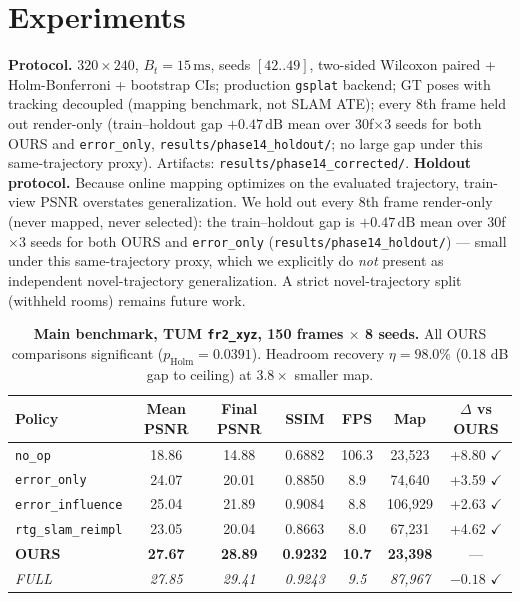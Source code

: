 \documentclass[10pt,twocolumn,letterpaper]{article}
\begin{document}
\section{Experiments}
\label{sec:experiments}
\textbf{Protocol.} $320 \times 240$, $B_t = 15\,\mathrm{ms}$, seeds $[42..49]$, two-sided Wilcoxon paired + Holm-Bonferroni + bootstrap CIs; production \texttt{gsplat} backend; GT poses with tracking decoupled (mapping benchmark, not SLAM ATE); every 8th frame held out render-only (train--holdout gap $+0.47\,\mathrm{dB}$ mean over 30f$\times$3 seeds for both OURS and \texttt{error\_only}, \texttt{results/phase14\_holdout/}; no large gap under this same-trajectory proxy).
Artifacts: \texttt{results/phase14\_corrected/}.
\textbf{Holdout protocol.} Because online mapping optimizes on the evaluated trajectory, train-view PSNR overstates generalization. We hold out every 8th frame render-only (never mapped, never selected): the train--holdout gap is $+0.47\,\mathrm{dB}$ mean over 30f$\times$3 seeds for both OURS and \texttt{error\_only} (\texttt{results/phase14\_holdout/}) --- small under this same-trajectory proxy, which we explicitly do \textit{not} present as independent novel-trajectory generalization. A strict novel-trajectory split (withheld rooms) remains future work.

\begin{table}[t]
\centering
\small
\begin{tabular}{lcccccc}
\toprule
\textbf{Policy} & \textbf{Mean PSNR} & \textbf{Final PSNR} & \textbf{SSIM} & \textbf{FPS} & \textbf{Map} & \textbf{$\Delta$ vs OURS} \\
\midrule
\texttt{no\_op} & 18.86 & 14.88 & 0.6882 & 106.3 & 23,523 & +8.80 $\checkmark$ \\
\texttt{error\_only} & 24.07 & 20.01 & 0.8850 & 8.9 & 74,640 & +3.59 $\checkmark$ \\
\texttt{error\_influence} & 25.04 & 21.89 & 0.9084 & 8.8 & 106,929 & +2.63 $\checkmark$ \\
\texttt{rtg\_slam\_reimpl} & 23.05 & 20.04 & 0.8663 & 8.0 & 67,231 & +4.62 $\checkmark$ \\
\textbf{OURS} & \textbf{27.67} & \textbf{28.89} & \textbf{0.9232} & \textbf{10.7} & \textbf{23,398} & --- \\
\textit{FULL} & \textit{27.85} & \textit{29.41} & \textit{0.9243} & \textit{9.5} & \textit{87,967} & $-0.18$ $\checkmark$ \\
\bottomrule
\end{tabular}
\caption{\textbf{Main benchmark, TUM \texttt{fr2\_xyz}, 150 frames $\times$ 8 seeds.} All OURS comparisons significant ($p_{\mathrm{Holm}} = 0.0391$). Headroom recovery $\eta = \mathbf{98.0\%}$ (0.18 dB gap to ceiling) at $3.8\times$ smaller map.}
\label{tab:main}
\end{table}
\end{document}

